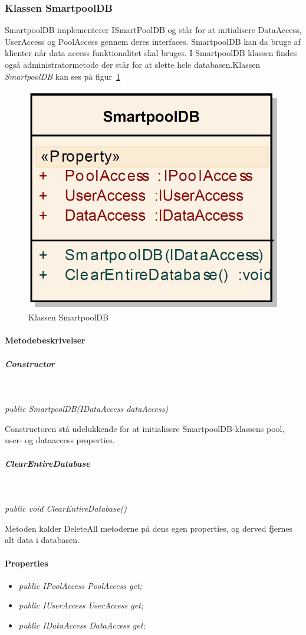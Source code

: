 \subsubsection{Klassen SmartpoolDB}
SmartpoolDB implementerer ISmartPoolDB og står for at initialisere DataAccess, UserAccess og PoolAccess gennem deres interfaces. SmartpoolDB kan da bruge af klienter når data access funktionalitet skal bruges. I SmartpoolDB klassen findes også administratormetode der står for at slette hele databasen.Klassen \textit{SmartpoolDB} kan ses på figur~\ref{fig:smartpoolDBClass}

\begin{figure}
\centering
\includegraphics[width=0.3\linewidth]{figs/implementering/smartpoolDBClass.PNG}
\caption{Klassen SmartpoolDB}
\label{fig:smartpoolDBClass}
\end{figure}

\paragraph{Metodebeskrivelser}

\subparagraph{Constructor}\

\textit{public SmartpoolDB(IDataAccess dataAccess)}

Constructoren stå udelukkende for at initialisere SmartpoolDB-klassens pool, user- og dataaccess properties.

\subparagraph{ClearEntireDatabase}\

\textit{public void ClearEntireDatabase()}

Metoden kalder DeleteAll metoderne på dens egen properties, og derved fjernes alt data i databasen.

\paragraph{Properties}

\begin{itemize}
	\item \textit{public IPoolAccess PoolAccess { get; }}
	\item \textit{public IUserAccess UserAccess { get; }}
	\item \textit{public IDataAccess DataAccess { get; }}
\end{itemize}





